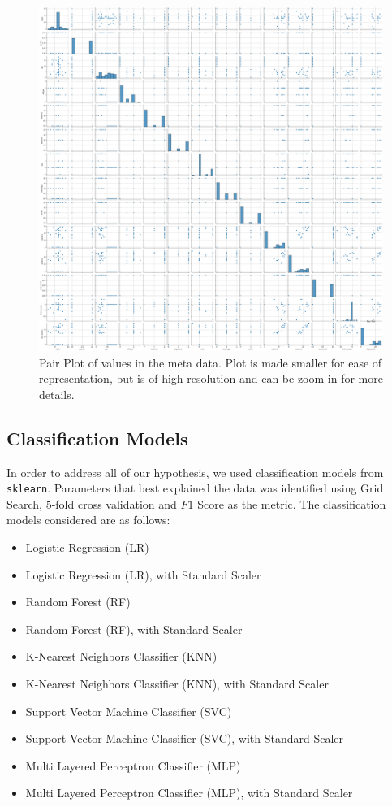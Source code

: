 \documentclass[11pt,a4paper]{article}
\begin{document}
\begin{figure}[ht!]
	\centering
	\includegraphics[scale=0.2]{images/score_pair_plot.png}
	\caption{Pair Plot of values in the meta data. Plot is made smaller for ease of representation, but is of high resolution and can be zoom in for more details.}
	\label{fig:pair_plot}
\end{figure}

\subsection{Classification Models}
In order to address all of our hypothesis, we used classification models from \texttt{sklearn}. Parameters that best explained the data was identified using Grid Search, $5$-fold cross validation and $F1$ Score as the metric. The classification models considered are as follows:
\begin{itemize}
	\itemsep0em
	\item Logistic Regression (LR)
	\item Logistic Regression (LR), with Standard Scaler
	\item Random Forest (RF)
	\item Random Forest (RF), with Standard Scaler
	\item K-Nearest Neighbors Classifier (KNN)
	\item K-Nearest Neighbors Classifier (KNN), with Standard Scaler
	\item Support Vector Machine Classifier (SVC)
	\item Support Vector Machine Classifier (SVC), with Standard Scaler
	\item Multi Layered Perceptron Classifier (MLP)
	\item Multi Layered Perceptron Classifier (MLP), with Standard Scaler
\end{itemize}
\end{document}
